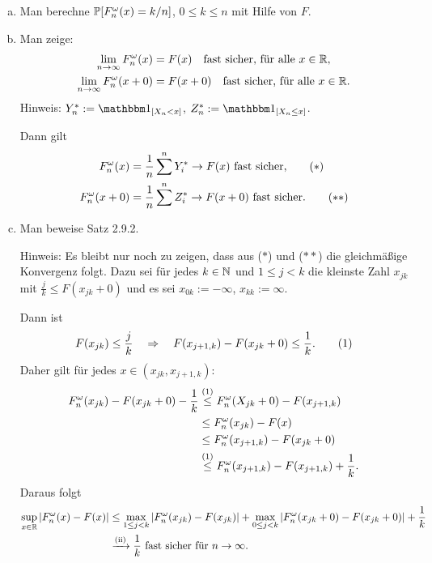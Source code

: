 \begin{prgp}[Zusatzaufgabe]
  \begin{enumerate}[(a)]
  \item Man berechne $\mathbb{P}[ F_n^\omega(x) = k/n ]$, $0 \le k \le n$ mit Hilfe von
    $F$.
  \item Man zeige:
    \begin{align*}
      \lim_{n \to \infty} F_n^\omega(x)
      &= F(x) \quad \text{fast sicher, für alle } x \in \mathbb{R}, \\
      \lim_{n \to \infty} F_n^\omega(x+0)
      &= F(x+0) \quad \text{fast sicher, für
        alle } x \in \mathbb{R}.
    \end{align*}
    Hinweis: $Y_n^* := \ind_{[X_n < x]}$, $Z_n^* := \ind_{[X_n \le x]}$.

    Dann gilt
    \begin{align*}
      F_n^\omega(x) &= \frac{1}{n} \sum^n Y_i^* \to F(x) \text{ fast sicher,} \tag{$\ast$} \\
      F_n^\omega(x+0) &= \frac{1}{n} \sum^n Z_i^* \to F(x+0) \text{ fast sicher.} \tag{$\ast\ast$}
    \end{align*}
  \item Man beweise Satz 2.9.2.

    Hinweis: Es bleibt nur noch zu zeigen, dass aus ($\ast$) und ($\ast\ast$)
    die gleichmäßige Konvergenz folgt. Dazu sei für jedes $k \in \mathbb{N}$ und $1
    \le j < k$ die kleinste Zahl $x_{jk}$ mit $\frac{j}{k} \le F( x_{jk} + 0)$
    und es sei $x_{0k} := - \infty$, $x_{kk} := \infty$.

    Dann ist
    \[ F(x_{jk}) \le \frac{j}{k} \quad \Rightarrow \quad F(x_{j+1,k}) - F(x_{jk} + 0) \le \frac{1}{k}.
      \tag{1} \]
    Daher gilt für jedes $x \in (x_{jk}, x_{j+1,k})$:
    \begin{align*}
      F_n^\omega(x_{jk}) - F(x_{jk}+0) - \frac{1}{k}
      &\overset{\text{(1)}}{\le} F_n^\omega (X_{jk} + 0) - F(x_{j+1,k}) \\
      &\le F_n^\omega(x_{jk}) - F(x) \\
      &\le F_n^\omega(x_{j+1,k}) -F(x_{jk} + 0) \\
      &\overset{\text{(1)}}{\le} F_n^\omega( x_{j+1,k} ) - F(x_{j+1,k}) + \frac{1}{k}.
    \end{align*}
    Daraus folgt
    \begin{align*}
      \sup_{x \in \mathbb{R}} | F_n^\omega(x) - F(x) |
      & \le \max_{1 \le j < k} | F_n^\omega(x_{jk}) - F(x_{jk}) |
        + \max_{0 \le j < k} | F_n^\omega(x_{jk} + 0) - F(x_{jk} + 0) | + \frac{1}{k} \\
      &\xrightarrow{\text{(ii)}} \frac{1}{k} \text{ fast sicher für } n \to \infty.
    \end{align*}
  \end{enumerate}
\end{prgp}

